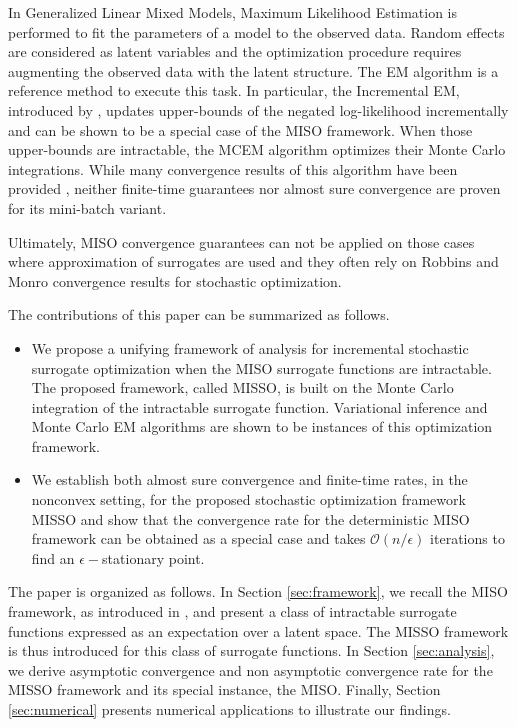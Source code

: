 \documentclass[11pt]{article}
\theoremstyle{t}
\begin{document}
In Generalized Linear Mixed Models, Maximum Likelihood Estimation is performed to fit the parameters of a model to the observed data. Random effects are considered as latent variables and the optimization procedure requires augmenting the observed data with the latent structure. The EM algorithm \citep{mclachlan} is a reference method to execute this task. In particular, the Incremental EM, introduced by \citep{neal}, updates upper-bounds of the negated log-likelihood incrementally and can be shown to be a special case of the MISO framework. When those upper-bounds are intractable, the MCEM \citep{wei} algorithm optimizes their Monte Carlo integrations. While many convergence results of this algorithm have been provided \citep{gersende, neath}, neither finite-time guarantees nor almost sure convergence are proven for its mini-batch variant.

Ultimately, MISO convergence guarantees can not be applied on those cases where approximation of surrogates are used and they often rely on Robbins and Monro \citep{robbins1951A} convergence results for stochastic optimization.


The contributions of this paper can be summarized as follows.
\begin{itemize}
\item We propose a unifying framework of analysis for incremental stochastic surrogate optimization when the MISO surrogate functions are intractable. The proposed framework, called MISSO, is built on the Monte Carlo integration of the intractable surrogate function.
Variational inference and Monte Carlo EM algorithms are shown to be instances of this optimization framework.
\item We establish both almost sure convergence and finite-time rates, in the nonconvex setting, for the proposed stochastic optimization framework MISSO and show that the convergence rate for the deterministic MISO framework can be obtained as a special case and takes $\mathcal{O}(n/\epsilon)$ iterations to find an $\epsilon-$stationary point. 
\end{itemize}

The paper is organized as follows. In Section \ref{sec:framework}, we recall the MISO framework, as introduced in \citep{mairal}, and present a class of intractable surrogate functions expressed as an expectation over a latent space. The MISSO framework is thus introduced for this class of surrogate functions. In Section \ref{sec:analysis}, we derive asymptotic convergence and non asymptotic convergence rate for the MISSO framework and its special instance, the MISO. 
Finally, Section \ref{sec:numerical} presents numerical applications to illustrate our findings.
\end{document}
